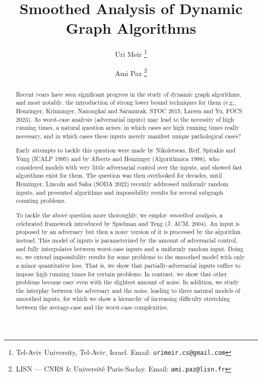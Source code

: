 \documentclass[letter,11pt]{article}
\title{Smoothed Analysis of Dynamic Graph Algorithms}
\author{}
\author{{Uri Meir \thanks{Tel-Aviv University, Tel-Aviv, Israel. Email: \texttt{urimeir.cs@gmail.com}}} \and {Ami Paz \thanks{LISN --- CNRS \& Universit\'e Paris-Saclay. Email: \texttt{ami.paz@lisn.fr}}}}
\date{}
\begin{document}
\maketitle
\thispagestyle{empty} \begin{abstract}
Recent years have seen significant progress in the study of dynamic graph algorithms, and most notably, the introduction of strong lower bound techniques for them (e.g., Henzinger, Krinninger,  Nanongkai and Saranurak, STOC 2015; Larsen and Yu, FOCS 2023). 
As worst-case analysis (adversarial inputs) may lead to the necessity of high running times, a natural question arises: in which cases are high running times really necessary, and in which cases these inputs merely manifest unique pathological cases?

Early attempts to tackle this question were made by
Nikoletseas, Reif, Spirakis and Yung (ICALP 1995) and by
Alberts and Henzinger (Algorithmica 1998), who considered models with very little adversarial control over the inputs, and showed fast algorithms exist for them.
The question was then overlooked for decades, until Henzinger, Lincoln and Saha (SODA 2022) recently addressed uniformly random inputs, and presented algorithms and impossibility results for several subgraph counting problems.

To tackle the above question more thoroughly, we employ \emph{smoothed analysis}, a celebrated framework introduced by Spielman and Teng (J. ACM, 2004). An input is proposed by an adversary but then a noisy version of it is processed by the algorithm instead.
This model of inputs is parameterized by the amount of adversarial control, and fully interpolates between 
worst-case inputs and a uniformly random input.
Doing so, we extend impossibility results for some problems to the smoothed model with only a minor quantitative loss. That is, we show that partially-adversarial inputs suffice to impose high running times for certain problems. 
In contrast, we show that other problems become easy even with the slightest amount of noise. 
In addition, we study the interplay between the adversary and the noise, leading to three natural models of smoothed inputs, for which we show a hierarchy of increasing difficulty stretching between the average-case and the worst-case complexities.
\end{abstract}



\newpage
\thispagestyle{empty} 
\tableofcontents

\thispagestyle{empty} 
\setcounter{page}{0}
\end{document}

